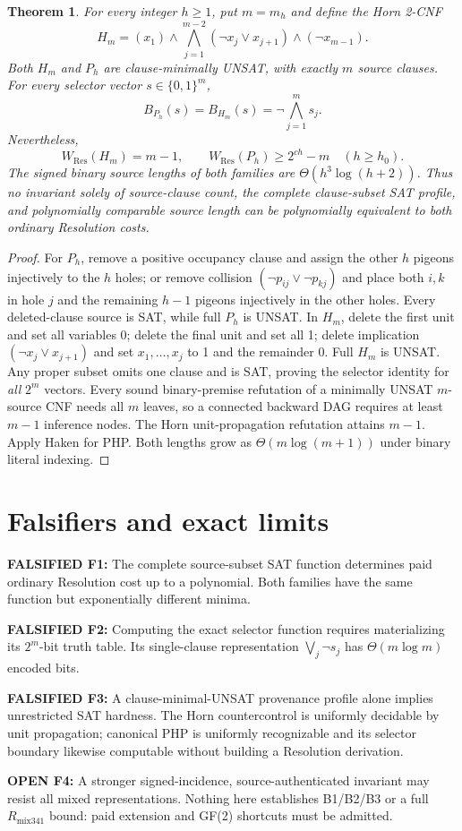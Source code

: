 \documentclass[11pt]{article}
\newtheorem{theorem}{Theorem}
\begin{document}
\begin{theorem}
For every integer $h\ge1$, put $m=m_h$ and define the Horn 2-CNF
\[
H_m=(x_1)\land\bigwedge_{j=1}^{m-2}(\neg x_j\lor x_{j+1})\land(\neg x_{m-1}).
\]
Both $H_m$ and $P_h$ are clause-minimally UNSAT, with exactly $m$ source clauses. For every selector vector $s\in\{0,1\}^m$,
\[
\boxed{B_{P_h}(s)=B_{H_m}(s)=\neg\bigwedge_{j=1}^{m}s_j.}
\]
Nevertheless,
\[
\boxed{W_{\mathrm{Res}}(H_m)=m-1,\qquad
W_{\mathrm{Res}}(P_h)\ge2^{ch}-m\quad(h\ge h_0).}
\]
The signed binary source lengths of both families are $\Theta(h^3\log(h+2))$. Thus no invariant solely of source-clause count, the \emph{complete} clause-subset SAT profile, and polynomially comparable source length can be polynomially equivalent to both ordinary Resolution costs.
\end{theorem}
\begin{proof}
For $P_h$, remove a positive occupancy clause and assign the other $h$ pigeons injectively to the $h$ holes; or remove collision $(\neg p_{ij}\lor\neg p_{kj})$ and place both $i,k$ in hole $j$ and the remaining $h-1$ pigeons injectively in the other holes. Every deleted-clause source is SAT, while full $P_h$ is UNSAT. In $H_m$, delete the first unit and set all variables 0; delete the final unit and set all 1; delete implication $(\neg x_j\lor x_{j+1})$ and set $x_1,\ldots,x_j$ to 1 and the remainder 0. Full $H_m$ is UNSAT. Any proper subset omits one clause and is SAT, proving the selector identity for \emph{all} $2^m$ vectors. Every sound binary-premise refutation of a minimally UNSAT $m$-source CNF needs all $m$ leaves, so a connected backward DAG requires at least $m-1$ inference nodes. The Horn unit-propagation refutation attains $m-1$. Apply Haken for PHP. Both lengths grow as $\Theta(m\log(m+1))$ under binary literal indexing.
\end{proof}

\section*{Falsifiers and exact limits}
\noindent\textbf{FALSIFIED F1:} The complete source-subset SAT function determines paid ordinary Resolution cost up to a polynomial. Both families have the same function but exponentially different minima.
\par\noindent\textbf{FALSIFIED F2:} Computing the exact selector function requires materializing its $2^m$-bit truth table. Its single-clause representation $\bigvee_j\neg s_j$ has $\Theta(m\log m)$ encoded bits.
\par\noindent\textbf{FALSIFIED F3:} A clause-minimal-UNSAT provenance profile alone implies unrestricted SAT hardness. The Horn countercontrol is uniformly decidable by unit propagation; canonical PHP is uniformly recognizable and its selector boundary likewise computable without building a Resolution derivation.
\par\noindent\textbf{OPEN F4:} A stronger signed-incidence, source-authenticated invariant may resist all mixed representations. Nothing here establishes B1/B2/B3 or a full $R_{\mathrm{mix341}}$ bound: paid extension and GF(2) shortcuts must be admitted.
\end{document}
